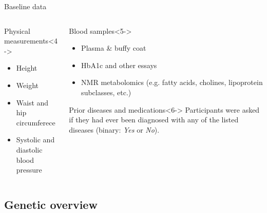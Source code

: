\begin{frame}{Baseline data}
\begin{columns}
{\begin{column}{0.3\textwidth}
            \begin{block}{Physical measurements}<4->
                \begin{itemize}
                    \item Height
                    \item Weight
                    \item Waist and hip circumferece
                    \item Systolic and diastolic blood pressure
                \end{itemize}
            \end{block}

        \end{column}

        \begin{column}{0.3\textwidth}

            \begin{block}{Blood samples}<5->
                \begin{itemize}
                    \item Plasma \& buffy coat
                    \item HbA1c and other essays
                    \item NMR metabolomics (e.g. fatty acids, cholines, lipoprotein subclasses, etc.)
                \end{itemize}
            \end{block}

            \begin{block}{Prior diseases and medications}<6->
                Participants were asked if they had ever been diagnosed with any of the listed diseases (binary: \textit{Yes} or \textit{No}).
            \end{block}

        \end{column}
        }
    \end{columns}
\end{frame}

\subsection{Genetic overview}

